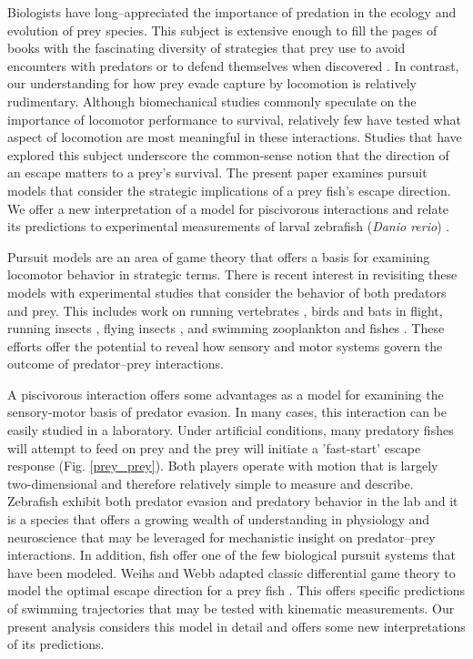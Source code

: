 \documentclass[12pt]{article}
\begin{document}
Biologists have long--appreciated the importance of predation in the ecology and evolution of prey species. This subject is extensive enough to fill the pages of books with the fascinating diversity of strategies that prey use to avoid encounters with predators \citep[e.g.][]{Ruxton:2004vb} or to defend themselves when discovered \citep[e.g.][]{Emlen:2014wb, Evans:1990va}. In contrast, our understanding for how prey evade capture by locomotion is relatively rudimentary. Although biomechanical studies commonly speculate on the importance of locomotor performance to survival, relatively few have tested what aspect of locomotion are most meaningful in these interactions. Studies that have explored this subject \citep[reviewed by][]{Domenici:2011tv} underscore the common-sense notion that the direction of an escape matters to a prey's survival. The present paper examines pursuit models that consider the strategic implications of a prey fish's escape direction. We offer a new interpretation of a model for piscivorous interactions \citep{Weihs:1984tb} and relate its predictions to experimental measurements of larval zebrafish (\textit{Danio rerio}) \citep{Stewart:2014cm}.

Pursuit models are an area of game theory that offers a basis for examining locomotor behavior in strategic terms. There is recent interest in revisiting these models \citep[e.g.][]{Howland:1974, Weihs:1984tb} with experimental studies that consider the behavior of both predators and prey. This includes work on running vertebrates \citep[e.g.][]{Wilson:2014fd}, birds \citep[e.g.][]{Hedenstrom:2001do, Kullberg:1998ur} and bats \citep[e.g.][]{Ghose:2006dk} in flight, running insects \citep{Domenici:2008kra}, flying insects \citep[e.g.][]{Combes:2012eta}, and swimming zooplankton \citep[e.g.][]{Arnott:1999wx} and fishes \citep[e.g.][]{Domenici:2000un}. These efforts offer the potential to reveal how sensory and motor systems govern the outcome of predator--prey interactions. 

A piscivorous interaction offers some advantages as a model for examining the sensory-motor basis of predator evasion. In many cases, this interaction can be easily studied in a laboratory. Under artificial conditions, many predatory fishes will attempt to feed on prey and the prey will initiate a 'fast-start' escape response (Fig. \ref{prey_prey}). Both players operate with motion that is largely two-dimensional and therefore relatively simple to measure and describe. Zebrafish exhibit both predator evasion and predatory behavior in the lab \citep{Stewart:2013bh} and it is a species that offers a growing wealth of understanding in physiology and neuroscience \citep[e.g.][]{McLean:2011gi, Briggs:2002uf} that may be leveraged for mechanistic insight on predator--prey interactions. In addition, fish offer one of the few biological pursuit systems that have been modeled. Weihs and Webb adapted classic differential game theory to model the optimal escape direction for a prey fish \citep{Weihs:1984tb}. This offers specific predictions of swimming trajectories that may be tested with kinematic measurements. Our present analysis considers this model in detail and offers some new interpretations of its predictions.
\end{document}
